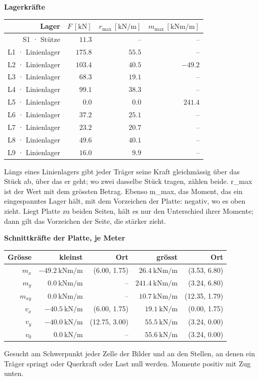 \documentclass[11pt,a4paper]{article}
\begin{document}
\noindent\textbf{Lagerkräfte}
\begin{longtable}{rrrr}
\hline
Lager & $F\ [\mathrm{kN}]$ & $r_{\max}\ [\mathrm{kN/m}]$ & $m_{\max}\ [\mathrm{kNm/m}]$ \\
\hline
\endhead
S1 · Stütze & $11.3$ & – & – \\
L1 · Linienlager & $175.8$ & $55.5$ & – \\
L2 · Linienlager & $103.4$ & $40.5$ & $-49.2$ \\
L3 · Linienlager & $68.3$ & $19.1$ & – \\
L4 · Linienlager & $99.1$ & $38.3$ & – \\
L5 · Linienlager & $0.0$ & $0.0$ & $241.4$ \\
L6 · Linienlager & $37.2$ & $25.1$ & – \\
L7 · Linienlager & $23.2$ & $20.7$ & – \\
L8 · Linienlager & $49.6$ & $40.1$ & – \\
L9 · Linienlager & $16.0$ & $9.9$ & – \\
\hline
\end{longtable}
Längs eines Linienlagers gibt jeder Träger seine Kraft gleichmässig über das Stück ab, über das er geht; wo zwei dasselbe Stück tragen, zählen beide. r\_max ist der Wert mit dem grössten Betrag. Ebenso m\_max, das Moment, das ein eingespanntes Lager hält, mit dem Vorzeichen der Platte: negativ, wo es oben zieht. Liegt Platte zu beiden Seiten, hält es nur den Unterschied ihrer Momente; dann gilt das Vorzeichen der Seite, die stärker zieht.

\noindent\textbf{Schnittkräfte der Platte, je Meter}
\begin{longtable}{rrrrr}
\hline
Grösse & kleinst & Ort & grösst & Ort \\
\hline
\endhead
$m_x$ & $-49.2\ \mathrm{kNm/m}$ & (6.00, 1.75) & $26.4\ \mathrm{kNm/m}$ & (3.53, 6.80) \\
$m_y$ & $0.0\ \mathrm{kNm/m}$ & – & $241.4\ \mathrm{kNm/m}$ & (3.24, 6.80) \\
$m_{xy}$ & $0.0\ \mathrm{kNm/m}$ & – & $10.7\ \mathrm{kNm/m}$ & (12.35, 1.79) \\
$v_x$ & $-40.5\ \mathrm{kN/m}$ & (6.00, 1.75) & $19.1\ \mathrm{kN/m}$ & (0.00, 1.75) \\
$v_y$ & $-40.0\ \mathrm{kN/m}$ & (12.75, 3.00) & $55.5\ \mathrm{kN/m}$ & (3.24, 0.00) \\
$v_0$ & $0.0\ \mathrm{kN/m}$ & – & $55.6\ \mathrm{kN/m}$ & (3.24, 0.00) \\
\hline
\end{longtable}
Gesucht am Schwerpunkt jeder Zelle der Bilder und an den Stellen, an denen ein Träger springt oder Querkraft oder Last null werden. Momente positiv mit Zug unten.
\end{document}
